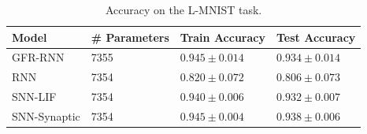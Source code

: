 \begin{table}
    \caption{Accuracy on the L-MNIST task.}
    \label{tab:rnn-results}
    \centering
    \begin{tabular}{llll}
    \toprule
    \textbf{Model} & \textbf{\# Parameters} & \textbf{Train Accuracy} & \textbf{Test Accuracy} \\
    \midrule
    GFR-RNN & 7355 & $0.945 \pm 0.014$ & $0.934 \pm 0.014$ \\
    RNN & 7354 & $0.820 \pm 0.072$ & $0.806 \pm 0.073$ \\
    SNN-LIF & 7354 & $0.940 \pm 0.006$ & $0.932 \pm 0.007$ \\
    SNN-Synaptic & 7354 & $0.945 \pm 0.004$ & $0.938 \pm 0.006$ \\
    \bottomrule
    \end{tabular}
\end{table}
